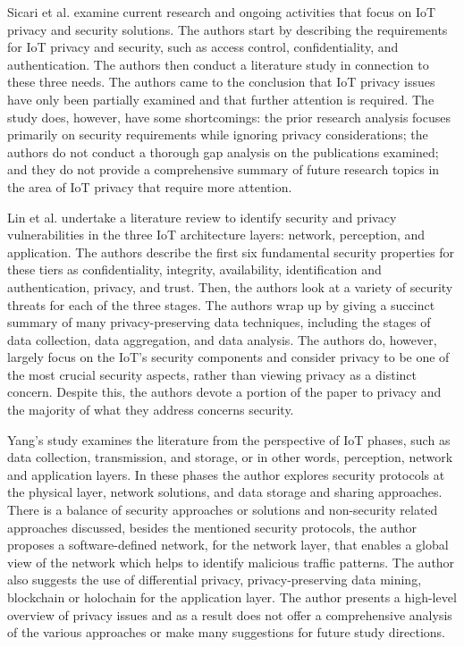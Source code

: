 Sicari et al. \cite{sicari2015security} examine current research and ongoing
activities that focus on IoT privacy and security solutions. The authors
start by describing the requirements for IoT privacy and security, such
as access control, confidentiality, and authentication. The authors then
conduct a literature study in connection to these three needs. The authors
came to the conclusion that IoT privacy issues have only been partially
examined and that further attention is required. The study does, however, have
some shortcomings: the prior research analysis focuses primarily on security
requirements while ignoring privacy considerations; the authors do not conduct
a thorough gap analysis on the publications examined; and they do not provide
a comprehensive summary of future research topics in the area of IoT privacy
that require more attention.

Lin et al. \cite{LinSurvey} undertake a literature review to identify security
and privacy vulnerabilities in the three IoT architecture layers: network,
perception, and application. The authors describe the first six fundamental
security properties for these tiers as confidentiality, integrity, availability,
identification and authentication, privacy, and trust. Then, the authors
look at a variety of security threats for each of the three stages. The
authors wrap up by giving a succinct summary of many privacy-preserving
data techniques, including the stages of data collection, data aggregation,
and data analysis. The authors do, however, largely focus on the IoT's security
components and consider privacy to be one of the most crucial security aspects,
rather than viewing privacy as a distinct concern. Despite this, the authors
devote a portion of the paper to privacy and the majority of what they address
concerns security.

Yang's study \cite{yang2022overview} examines the literature from the perspective
of IoT phases, such as data collection, transmission, and storage, or in other
words, perception, network and application layers. In these phases the author explores
security protocols at the physical layer, network solutions, and data storage and
sharing approaches. There is a balance of security approaches or solutions and
non-security related approaches discussed, besides the mentioned security protocols,
the author proposes a software-defined network, for the network layer, that enables
a global view of the network which helps to identify malicious traffic patterns. The
author also suggests the use of differential privacy, privacy-preserving data mining,
blockchain or holochain for the application layer. The author presents a high-level
overview of privacy issues and as a result does not offer a comprehensive analysis of
the various approaches or make many suggestions for future study directions.

